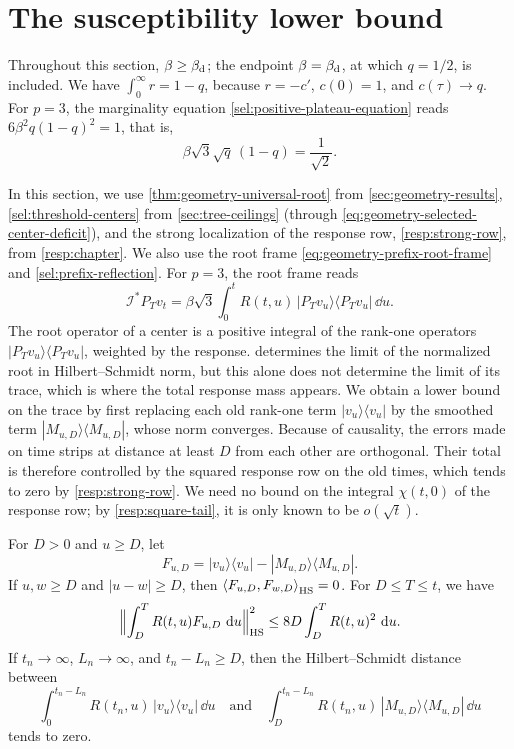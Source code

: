 \section{The susceptibility lower bound}
\label{sec:geometry-susceptibility}

Throughout this section, $\beta\ge\beta_{\mathrm d}$; the endpoint $\beta=\beta_{\mathrm d}$, at which $q=1/2$, is included. We have $\int_0^\infty r=1-q$, because $r=-c'$, $c(0)=1$, and $c(\tau)\to q$. For $p=3$, the marginality equation \eqref{sel:positive-plateau-equation} reads $6\beta^2q(1-q)^2=1$, that is,
\begin{equation}\label{eq:geometry-marginal-normalization}
 \beta\sqrt3\sqrt q\,(1-q)=\frac1{\sqrt2} .
\end{equation}

In this section, we use \cref{thm:geometry-universal-root} from \cref{sec:geometry-results}, \cref{sel:threshold-centers} from \cref{sec:tree-ceilings} (through \eqref{eq:geometry-selected-center-deficit}), and the strong localization of the response row, \cref{resp:strong-row}, from \cref{resp:chapter}. We also use the root frame \eqref{eq:geometry-prefix-root-frame} and \cref{sel:prefix-reflection}. For $p=3$, the root frame reads
\begin{equation}\label{eq:geometry-cubic-root-frame}
 \mathcal I^*P_Tv_t=\beta\sqrt3\int_0^tR(t,u)\,|P_Tv_u\rangle\langle P_Tv_u|\,\dd u .
\end{equation}
The root operator of a center is a positive integral of the rank-one operators $|P_Tv_u\rangle\langle P_Tv_u|$, weighted by the response.  determines the limit of the normalized root in Hilbert--Schmidt norm, but this alone does not determine the limit of its trace, which is where the total response mass appears. We obtain a lower bound on the trace by first replacing each old rank-one term $|v_u\rangle\langle v_u|$ by the smoothed term $|M_{u,D}\rangle\langle M_{u,D}|$, whose norm converges. Because of causality, the errors made on time strips at distance at least $D$ from each other are orthogonal. Their total is therefore controlled by the squared response row on the old times, which tends to zero by \cref{resp:strong-row}. We need no bound on the integral $\chi(t,0)$ of the response row; by \eqref{resp:square-tail}, it is only known to be $o(\sqrt t)$.

\begin{lemma}
\label{lem:geometry-disjoint-strips}
For $D>0$ and $u\ge D$, let
\[
 F_{u,D}=|v_u\rangle\langle v_u|-|M_{u,D}\rangle\langle M_{u,D}| .
\]
If $u,w\ge D$ and $|u-w|\ge D$, then $\left\langle F_{u,D},F_{w,D}\right\rangle_{\mathrm{HS}}=0$. For $D\le T\le t$, we have
\begin{equation}
 \Bigl\|\int_D^TR(t,u)F_{u,D}\,\mathop{}\!\mathrm d u\Bigr\|_{\mathrm{HS}}^2\le8D\int_D^TR(t,u)^2\,\mathop{}\!\mathrm d u .
 \label{eq:geometry-disjoint-strips}
\end{equation}
If $t_n\to\infty$, $L_n\to\infty$, and $t_n-L_n\ge D$, then the Hilbert--Schmidt distance between
\[
 \int_0^{t_n-L_n}R(t_n,u)\,|v_u\rangle\langle v_u|\,\dd u
 \quad\text{and}\quad
 \int_D^{t_n-L_n}R(t_n,u)\,|M_{u,D}\rangle\langle M_{u,D}|\,\dd u
\]
tends to zero.
\end{lemma}

